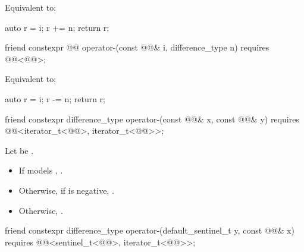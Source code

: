 \begin{itemdescr}
\pnum
\effects
Equivalent to:
\begin{codeblock}
auto r = i;
r += n;
return r;
\end{codeblock}
\end{itemdescr}

%
\begin{itemdecl}
friend constexpr @@ operator-(const @@& i, difference_type n)
  requires @@<@@>;
\end{itemdecl}

\begin{itemdescr}
\pnum
\effects
Equivalent to:
\begin{codeblock}
auto r = i;
r -= n;
return r;
\end{codeblock}
\end{itemdescr}

%
\begin{itemdecl}
friend constexpr difference_type operator-(const @@& x, const @@& y)
  requires @@<iterator_t<@@>, iterator_t<@@>>;
\end{itemdecl}

\begin{itemdescr}
\pnum
\returns
Let  be .
\begin{itemize}
\item
If  models ,
.
\item
Otherwise, if  is negative, .
\item
Otherwise, .
\end{itemize}
\end{itemdescr}

%
\begin{itemdecl}
friend constexpr difference_type operator-(default_sentinel_t y, const @@& x)
  requires @@<sentinel_t<@@>, iterator_t<@@>>;
\end{itemdecl}

